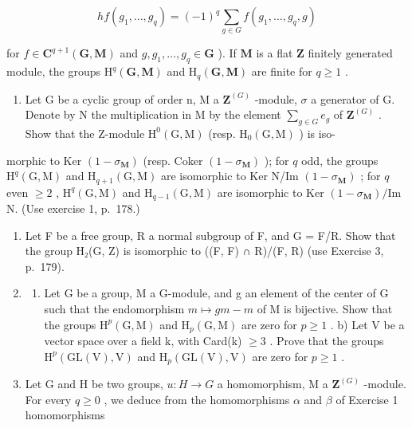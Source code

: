 \[
h f (g _ {1}, \dots , g _ {q}) = (- 1) ^ {q} \sum_ {g \in G} f (g _ {1}, \dots , g _ {q}, g)
\]

for \(f \in \mathbf{C}^{q+1}(\mathbf{G}, \mathbf{M})\) and \(g, g_1, \ldots, g_q \in \mathbf{G}\) ). If \(\mathbf{M}\) is a flat \(\mathbf{Z}\) finitely generated module, the groups \(\mathrm{H}^q(\mathbf{G}, \mathbf{M})\) and \(\mathrm{H}_q(\mathbf{G}, \mathbf{M})\) are finite for \(q \geqslant 1\) .

\begin{enumerate}
\def\labelenumi{\arabic{enumi})}
\setcounter{enumi}{6}
\tightlist
\item
  Let G be a cyclic group of order n, M a \(\mathbf{Z}^{(G)}\) -module, \(\sigma\) a generator of G. Denote by N the multiplication in M by the element \(\sum_{g\in G}e_{g}\) of \(\mathbf{Z}^{(G)}\) . Show that the Z-module \(\mathrm{H}^{0}(\mathrm{G},\mathrm{M})\) (resp. \(\mathrm{H}_{0}(\mathrm{G},\mathrm{M})\) ) is iso-
\end{enumerate}

morphic to Ker \((1 - \sigma_{\mathbf{M}})\) (resp. Coker \((1 - \sigma_{\mathbf{M}})\) ); for \(q\) odd, the groups \(\mathrm{H}^q (\mathrm{G},\mathrm{M})\) and \(\mathrm{H}_{q + 1}(\mathrm{G},\mathrm{M})\) are isomorphic to Ker N/Im \((1 - \sigma_{\mathbf{M}})\) ; for \(q\) even \(\geqslant 2\) , \(\mathrm{H}^q (\mathrm{G},\mathrm{M})\) and \(\mathrm{H}_{q - 1}(\mathrm{G},\mathrm{M})\) are isomorphic to Ker \((1 - \sigma_{\mathbf{M}}) / \mathrm{Im}\) N. (Use exercise 1, p.~178.)

\begin{enumerate}
\def\labelenumi{\arabic{enumi})}
\setcounter{enumi}{7}
\item
  Let F be a free group, R a normal subgroup of F, and G = F/R. Show that the group H₂(G, Z) is isomorphic to ((F, F) ∩ R)/(F, R) (use Exercise 3, p.~179).
\item
  \begin{enumerate}
  \def\labelenumii{\alph{enumii})}
  \tightlist
  \item
    Let G be a group, M a G-module, and g an element of the center of G such that the endomorphism \(m \mapsto gm - m\) of M is bijective. Show that the groups \(\mathrm{H}^{p}(\mathrm{G}, \mathrm{M})\) and \(\mathrm{H}_{p}(\mathrm{G}, \mathrm{M})\) are zero for \(p \geqslant 1\) . b) Let V be a vector space over a field k, with Card(k) \(\geqslant 3\) . Prove that the groups \(\mathrm{H}^{p}(\mathrm{GL}(\mathrm{V}), \mathrm{V})\) and \(\mathrm{H}_{p}(\mathrm{GL}(\mathrm{V}), \mathrm{V})\) are zero for \(p \geqslant 1\) .
  \end{enumerate}
\item
  Let G and H be two groups, \(u: H \to G\) a homomorphism, M a \(\mathbf{Z}^{(G)}\) -module. For every \(q \geqslant 0\) , we deduce from the homomorphisms \(\alpha\) and \(\beta\) of Exercise 1 homomorphisms
\end{enumerate}

